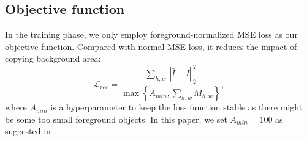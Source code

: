 \documentclass[10pt,twocolumn,letterpaper]{article}
\begin{document}
\subsection{Objective function}
In the training phase, we only employ foreground-normalized MSE loss as our objective function. Compared with normal MSE loss, it reduces the impact of copying background area:
\begin{equation}
    \mathcal{L}_{rec} = \dfrac{\sum\limits_{h,w} \left\Vert \hat{I} - I  \right\Vert_2^2}{\max \left \{ A_{min},\sum\limits_{h,w}M_{h,w} \right\} },
\end{equation}
where $A_{min}$ is a hyperparameter to keep the loss function stable as there might be some too small foreground objects. In this paper, we set $A_{min}=100$ as suggested in \cite{Sofiiuk_2021_WACV}.
\end{document}
